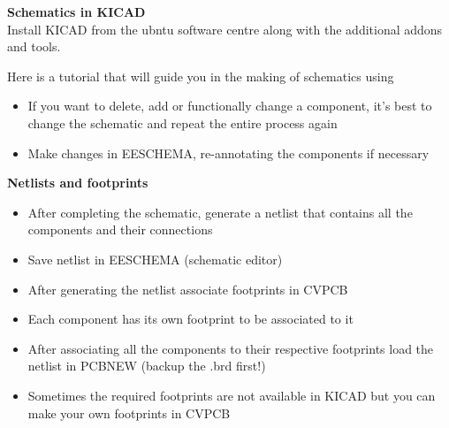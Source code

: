 \documentclass[16pt]{article}
\begin{document}
{\textbf{Schematics in KICAD}} \\
Install KICAD from the ubntu software centre along with the additional
addons and tools.

Here is a tutorial that will guide you in the making of schematics using

\begin{itemize}

\item
  If you want to delete, add or functionally change a component, it's
  best to change the schematic and repeat the entire process again
\item
  Make changes in EESCHEMA, re-annotating the components if necessary
  \vspace{0.2cm}
\end{itemize}

{\textbf{Netlists and
footprints}}

\begin{itemize}

\item
  After completing the schematic, generate a netlist that contains all
  the components and their connections
\item
  Save netlist in EESCHEMA (schematic editor)
\item
  After generating the netlist associate footprints in CVPCB
\item
  Each component has its own footprint to be associated to it
\item
  After associating all the components to their respective footprints
  load the netlist in PCBNEW (backup the .brd first!)
\end{itemize}


\begin{itemize}

\item
  Sometimes the required footprints are not available in KICAD but you
  can make your own footprints in CVPCB
\end{itemize}
\end{document}
